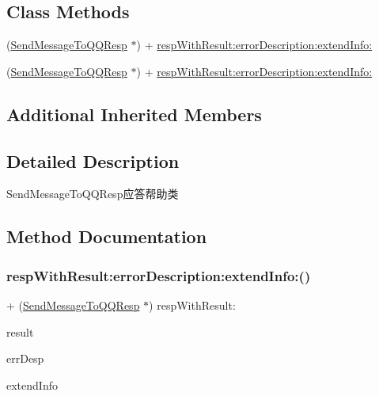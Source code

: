 \subsection*{Class Methods}
\begin{DoxyCompactItemize}
\item 
(\mbox{\hyperlink{interface_send_message_to_q_q_resp}{Send\+Message\+To\+Q\+Q\+Resp}} $\ast$) + \mbox{\hyperlink{interface_send_message_to_q_q_resp_a311fc43ae8a74de06ad94c1b567aa7af}{resp\+With\+Result\+:error\+Description\+:extend\+Info\+:}}
\item 
(\mbox{\hyperlink{interface_send_message_to_q_q_resp}{Send\+Message\+To\+Q\+Q\+Resp}} $\ast$) + \mbox{\hyperlink{interface_send_message_to_q_q_resp_a311fc43ae8a74de06ad94c1b567aa7af}{resp\+With\+Result\+:error\+Description\+:extend\+Info\+:}}
\end{DoxyCompactItemize}
\subsection*{Additional Inherited Members}


\subsection{Detailed Description}
Send\+Message\+To\+Q\+Q\+Resp应答帮助类 

\subsection{Method Documentation}
\mbox{\label{interface_send_message_to_q_q_resp_a311fc43ae8a74de06ad94c1b567aa7af}} 
\subsubsection{\texorpdfstring{resp\+With\+Result\+:error\+Description\+:extend\+Info\+:()}{respWithResult:errorDescription:extendInfo:()}\hspace{0.1cm}{\footnotesize\ttfamily [1/2]}}
{\footnotesize\ttfamily + (\mbox{\hyperlink{interface_send_message_to_q_q_resp}{Send\+Message\+To\+Q\+Q\+Resp}} $\ast$) resp\+With\+Result\+: \begin{DoxyParamCaption}\item[{(N\+S\+String $\ast$)}]{result }\item[{errorDescription:(N\+S\+String $\ast$)}]{err\+Desp }\item[{extendInfo:(N\+S\+String $\ast$)}]{extend\+Info }\end{DoxyParamCaption}}

